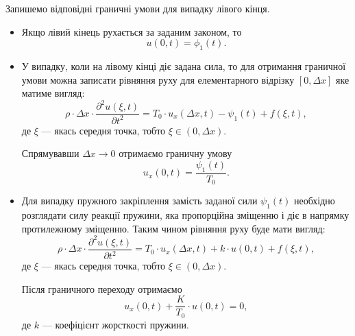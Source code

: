 Запишемо відповідні граничні умови для випадку лівого кінця.
\begin{itemize}
	\item Якщо лівий кінець рухається за заданим законом, то 
	\begin{equation}
		u(0, t) = \phi_1(t).
	\end{equation}
	\item У випадку, коли на лівому кінці діє задана сила, то для отримання граничної умови  можна записати рівняння руху для елементарного відрізку $[0, \Delta x]$  яке матиме вигляд:
	\begin{equation}
		\rho \cdot \Delta x \cdot \frac{\partial^2 u(\xi, t)}{\partial t^2} = T_0 \cdot u_x(\Delta x, t) - \psi_1(t) + f(\xi, t),
	\end{equation}
	де $\xi$ --- якась середня точка, тобто $\xi \in (0, \Delta x)$. \medskip
 
	Спрямувавши $\Delta x \to 0$ отримаємо граничну умову 
	\begin{equation}
		u_x(0, t) = \frac{\psi_1(t)}{T_0}.
	\end{equation}

	\item Для випадку пружного закріплення замість заданої сили $\psi_1(t)$ необхідно розглядати силу реакції пружини, яка пропорційна зміщенню і діє в напрямку протилежному зміщенню. Таким чином рівняння руху буде мати вигляд:
	\begin{equation}
		\rho \cdot \Delta x \cdot \frac{\partial^2 u(\xi, t)}{\partial t^2} = T_0 \cdot u_x(\Delta x, t) + k \cdot u(0, t) + f(\xi, t),
	\end{equation}
	де $\xi$ --- якась середня точка, тобто $\xi \in (0, \Delta x)$. \medskip

	Після граничного переходу отримаємо 
	\begin{equation}
		u_x(0, t) + \frac{K}{T_0} \cdot u(0, t) = 0,	
	\end{equation}
	де $k$ --- коефіцієнт жорсткості пружини.
\end{itemize}

% 